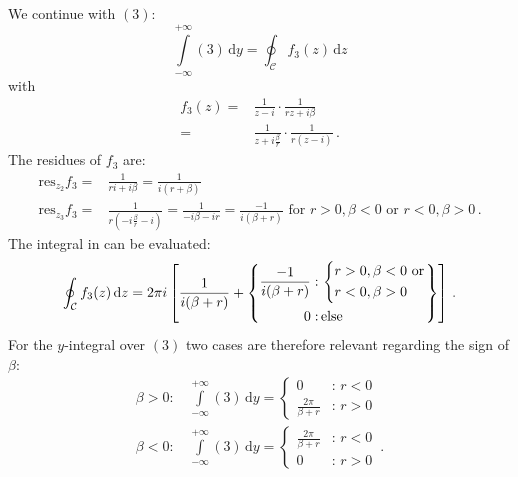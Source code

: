 We continue with $(3)$:
\begin{equation}
  \int\limits_{-\infty}^{+\infty}
    (3) \,\mathrm{d}y
= \oint_\mathcal{C}
    f_3(z) \,\mathrm{d}z \label{eqn:int_f3}
\end{equation}
with
\begin{align}
  f_3(z) =& \frac{1}{z - i}    \cdot \frac{1}{r z + i \beta} \\
         =& \frac{1}{z + i \frac{\beta}{r}} \cdot \frac{1}{r(z - i)} \, .
\end{align}
The residues of $f_3$ are:
\begin{align}
 \mathrm{res}_{z_2} f_3 =& \frac{1}{r i + i \beta}
                        =  \frac{1}{i (r + \beta)} \\
 \mathrm{res}_{z_3} f_3 =& \frac{1}{r(-i\frac{\beta}{r} - i)}
                        =  \frac{1}{-i \beta - i r}
                        =  \frac{-1}{i(\beta + r)}
                        \textrm{ for } r>0, \beta< 0 \textrm{ or } r<0, \beta>0 \, .
\end{align}
The integral in  can be evaluated:
\begin{equation}
   \oint_\mathcal{C} f_3(z) \,\mathrm{d}z
 = 2 \pi i \left[ \frac{1}{i(\beta + r)} \\
                 +\left\{ \begin{aligned}
                   \frac{-1}{i(\beta + r)} :&\, \left\{\begin{aligned}
                                                       r>0,&\, \beta<0 \textrm{ or} \\
                                                       r<0,&\, \beta>0
                                                      \end{aligned} \right. \\
                   0                           :&\, \textrm{else}
                  \end{aligned} \right\}
 \right] \, .
\end{equation}
For the $y$-integral over $(3)$ two cases are therefore relevant regarding the sign of $\beta$:
\begin{align}
 \beta > 0 :&\, \int\limits_{-\infty}^{+\infty} (3) \,\mathrm{d}y = \begin{cases}
                                                                      0                      &:\, r<0 \\
                                                                      \frac{2\pi}{\beta + r} &:\, r>0
                                                                    \end{cases} \\
 \beta < 0 :&\, \int\limits_{-\infty}^{+\infty} (3) \,\mathrm{d}y = \begin{cases}
                                                                      \frac{2\pi}{\beta + r} &:\, r<0 \\
                                                                      0                      &:\, r>0
                                                                    \end{cases} \, .
\end{align}
